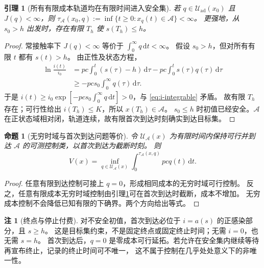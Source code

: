 \documentclass[11pt,a4paper,UTF8]{ctexart}
\newtheorem{proposition}[theorem]{命题}
\newtheorem{lemma}[theorem]{引理}
\theoremstyle{definition}
\newtheorem{remark}[theorem]{注}
\newcommand{\Acal}{\mathcal A}
\newcommand{\Uad}{\mathcal U_{\mathrm{ad}}}
\newcommand{\dd}{\,\mathrm d}
\begin{document}
\begin{lemma}[所有有限成本轨道均在有限时间进入安全集]
\label{lem:finite-entry}
若 $q\in\Uad(x_0)$ 且 $J(q)<\infty$，则
$\tau_{\Acal}(x_0,q):=\inf\{t\ge0:x_q(t)\in\Acal\}<\infty$。
更强地，从 $s_0>h$ 出发时，存在有限 $T_h$ 使 $s(T_h)\le h$。
\end{lemma}
\begin{proof}
常接触率下 $J(q)<\infty$ 等价于 $\int_0^\infty q\dd t<\infty$。
假设 $s_0>h$，但对所有有限 $t$ 都有 $s(t)>h$。
由正性及状态方程，
\begin{align*}
\ln\frac{i(t)}{i_0}
&=pc\int_0^t(s(\tau)-h)\dd\tau-pc\int_0^t s(\tau)q(\tau)\dd\tau\\
&\ge-pcs_0\int_0^\infty q(\tau)\dd\tau.
\end{align*}
于是 $i(t)\ge i_0\exp[-pcs_0\int_0^\infty q\dd t]>0$，与 \eqref{eq:i-integrable} 矛盾。
故有限 $T_h$ 存在；可行性给出 $i(T_h)\le K$，所以 $x(T_h)\in\Acal$。
$s_0\le h$ 时初值已经安全。$\Acal$ 在正状态域相对闭，轨道连续，故有限首次到达时刻确实到达目标集。
\end{proof}

\begin{proposition}[无穷时域与首次到达问题等价]
\label{prop:exit-equivalence}
令 $\mathcal U_{\Acal}(x)$ 为有限时间内保持可行并到达 $\Acal$ 的可测控制类，以首次到达为截断时刻。
则
\begin{equation}
V(x)=\inf_{q\in\mathcal U_{\Acal}(x)}
\int_0^{\tau_{\Acal}(x,q)}pcq(t)\dd t.
\label{eq:exit-value}
\end{equation}
\end{proposition}
\begin{proof}
任意有限到达控制可接上 $q=0$，形成相同成本的无穷时域可行控制。
反之，任意有限成本无穷时域控制由引理\ref{lem:finite-entry}可在首次到达时截断，成本不增加。
无穷成本控制不会降低已知有限的下确界。两个方向给出等式。
\end{proof}
\begin{remark}[终点与停止付费]
对不安全初值，首次到达必位于 $i=a(s)$ 的正感染部分，且 $s\ge h$。
这是目标集约束，不是固定终点或固定终止时间；无需 $i=0$，也无需 $s=h$。
首次到达后，$q=0$ 是零成本可行延拓。若允许在安全集内继续等待再宣布终止，记录的终止时间可不唯一，
这不属于控制在几乎处处意义下的非唯一性。
\end{remark}
\end{document}
